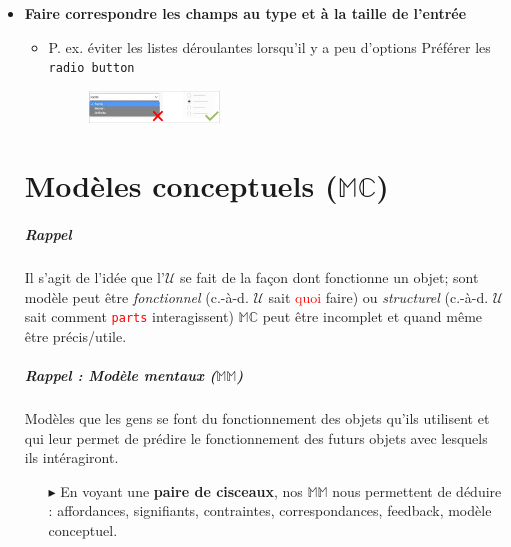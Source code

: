 \documentclass{report}
\begin{document}
\begin{multicols*}{3}
\begin{itemize}
  \item \textbf{Faire correspondre les champs 
    au type et à la taille de l'entrée} 
    \begin{itemize}
      \item
      P. ex. éviter les listes déroulantes 
        lorsqu'il y a peu d'options
        Préférer les \texttt{radio button}  
    \begin{figure}[H]
      \begin{center}
        \includegraphics[width=0.35\textwidth]{Formulaire4.png}
      \end{center}
    \end{figure}
    \end{itemize}

    \chapter{Modèles conceptuels ($\mathbb{MC}$)}
    
    \paragraph{Rappel}
    Il s'agit de l'idée que l'$\mathcal{U}$ se fait 
    de la façon dont fonctionne un objet; sont modèle 
    peut être \textit{fonctionnel} 
    (c.-à-d. $\mathcal{U}$ sait \textcolor{red}{quoi} faire)  
    ou \textit{structurel} (c.-à-d. $\mathcal{U}$ sait 
    comment \texttt{\textcolor{red}{parts}} interagissent)  
    $\mathbb{MC}$ peut être incomplet et quand même être 
    précis/utile. 

    \noindent
    \paragraph{ Rappel : Modèle mentaux ($\mathbb{MM}$)}
    Modèles que les gens se font du fonctionnement 
    des objets qu'ils utilisent et qui leur permet 
    de prédire le fonctionnement des 
    futurs objets avec lesquels ils intéragiront. 

    \begin{itemize}
      \item [$\blacktriangleright$ ] En voyant une  
        \textbf{paire de cisceaux}, nos $\mathbb{MM}$ nous 
        permettent de déduire : affordances, signifiants, 
        contraintes, correspondances, feedback, 
        modèle conceptuel. 
    \end{itemize}



\end{itemize}
\end{multicols*}
\end{document}
